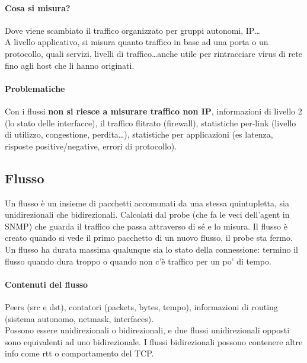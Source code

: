 \documentclass[10pt]{book}
\begin{document}
\paragraph{Cosa si misura?} Dove viene scambiato il traffico organizzato per gruppi autonomi, IP\ldots\\
A livello applicativo, si misura quanto traffico in base ad una porta o un protocollo, quali servizi, livelli di traffico\ldots anche utile per rintracciare virus di rete fino agli host che li hanno originati.
\paragraph{Problematiche} Con i flussi \textbf{non si riesce a misurare traffico non IP}, informazioni di livello 2 (lo stato delle interfacce), il traffico flitrato (firewall), statistiche per-link (livello di utilizzo, congestione, perdita\ldots), statistiche per applicazioni (es latenza, risposte positive/negative, errori di protocollo).
\subsection{Flusso} Un flusso è un insieme di pacchetti accomunati da una stessa quintupletta, sia unidirezionali che bidirezionali. Calcolati dal probe (che fa le veci dell'agent in SNMP) che guarda il traffico che passa attraverso di sé e lo misura. Il flusso è creato quando si vede il primo pacchetto di un nuovo flusso, il probe sta fermo.\\
Un flusso ha durata massima qualunque sia lo stato della connessione: termino il flusso quando dura troppo o quando non c'è traffico per un po' di tempo.
\paragraph{Contenuti del flusso} Peers (src e dst), contatori (packets, bytes, tempo), informazioni di routing (sistema autonomo, netmask, interfaces).\\
Possono essere unidirezionali o bidirezionali, e due flussi unidirezionali opposti sono equivalenti ad uno bidirezionale. I flussi bidirezionali possono contenere altre info come rtt o comportamento del TCP.
\end{document}
